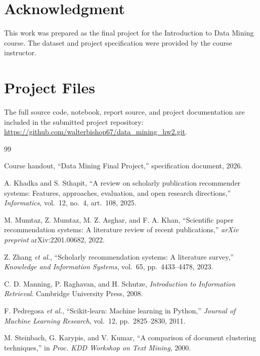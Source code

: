 \documentclass[conference]{IEEEtran}
\begin{document}
\section*{Acknowledgment}
This work was prepared as the final project for the Introduction to Data Mining course. The dataset and project specification were provided by the course instructor.

\section*{Project Files}
The full source code, notebook, report source, and project documentation are included in the submitted project repository: \url{https://github.com/walterbishop67/data_mining_hw2.git}.

\begin{thebibliography}{99}

Course handout, ``Data Mining Final Project,'' specification document, 2026.

A. Khadka and S. Sthapit, ``A review on scholarly publication recommender systems: Features, approaches, evaluation, and open research directions,'' \emph{Informatics}, vol.~12, no.~4, art.~108, 2025.

M. Mumtaz, Z. Mumtaz, M. Z. Asghar, and F. A. Khan, ``Scientific paper recommendation systems: A literature review of recent publications,'' \emph{arXiv preprint} arXiv:2201.00682, 2022.

Z. Zhang \emph{et al.}, ``Scholarly recommendation systems: A literature survey,'' \emph{Knowledge and Information Systems}, vol.~65, pp.~4433--4478, 2023.

C. D. Manning, P. Raghavan, and H. Schutze, \emph{Introduction to Information Retrieval}. Cambridge University Press, 2008.

F. Pedregosa \emph{et al.}, ``Scikit-learn: Machine learning in Python,'' \emph{Journal of Machine Learning Research}, vol.~12, pp.~2825--2830, 2011.

M. Steinbach, G. Karypis, and V. Kumar, ``A comparison of document clustering techniques,'' in \emph{Proc. KDD Workshop on Text Mining}, 2000.

\end{thebibliography}
\end{document}
